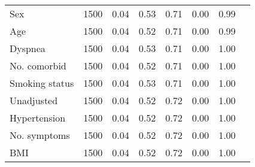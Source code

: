 \documentclass{article}
\begin{document}
{\begin{longtable}{lccccccc}
Sex & 1500 & 0.04 & 0.53 & 0.71 &  0.00 & 0.99 \\ 
Age & 1500 & 0.04 & 0.52 & 0.71 &  0.00 & 0.99 \\ 
Dyspnea & 1500 & 0.04 & 0.53 & 0.71 &  0.00 & 1.00 \\ 
No. comorbid & 1500 & 0.04 & 0.52 & 0.71 &  0.00 & 1.00 \\ 
Smoking status & 1500 & 0.04 & 0.53 & 0.71 &  0.00 & 1.00 \\ 
Unadjusted & 1500 & 0.04 & 0.52 & 0.72 &  0.00 & 1.00 \\ 
Hypertension & 1500 & 0.04 & 0.52 & 0.72 &  0.00 & 1.00 \\ 
No. symptoms & 1500 & 0.04 & 0.52 & 0.72 &  0.00 & 1.00 \\ 
BMI & 1500 & 0.04 & 0.52 & 0.72 &  0.00 & 1.00 \\
\bottomrule
\hline
\end{longtable}
}

\clearpage
\end{document}
